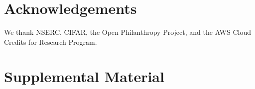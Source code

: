 \documentclass[letterpaper]{article} %
\begin{document}
\section{Acknowledgements}
We thank NSERC, CIFAR, the Open Philanthropy Project, and the AWS Cloud Credits for Research Program. %

\fontsize{9.0pt}{10.0pt} \selectfont



\onecolumn
\section{Supplemental Material}
\label{sec:appendix}

\end{document}
